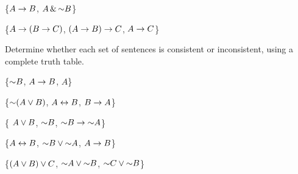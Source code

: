 \begin{earg}
% 
%


\item \{$A \rightarrow B$, $A \,\&\, \mathord{\sim} B$\}\vspace{.5ex} %

\item \{$A \rightarrow (B \rightarrow C)$, $(A \rightarrow B) \rightarrow C$, $A \rightarrow C$\}\vspace{.5ex} %

\end{earg}

\noindent\problempart
\label{pr.TT.consistent}
Determine whether each set of sentences is consistent or inconsistent, using a complete truth table. 
\begin{earg}
\item \{$\mathord{\sim} B$, $A \rightarrow B$, $A$\} \vspace{.5ex}%
\item \{$\mathord{\sim}(A \vee B)$, $A \leftrightarrow B$, $B \rightarrow A$\}\vspace{.5ex} %
\item \{ $A \vee B$, $\mathord{\sim} B$, $\mathord{\sim} B \rightarrow \mathord{\sim} A$\}\vspace{.5ex} %
\item \{$A \leftrightarrow B$, $\mathord{\sim} B \vee \mathord{\sim} A$, $A \rightarrow B$\}\vspace{.5ex} %
\item \{$(A \vee B) \vee C$, $\mathord{\sim} A \vee \mathord{\sim} B$, $\mathord{\sim} C \vee \mathord{\sim} B$\}\vspace{.5ex} %
\end{earg}




